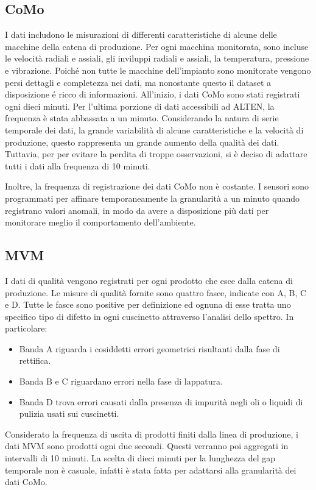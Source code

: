\subsection{CoMo}
I dati includono le misurazioni di differenti caratteristiche di alcune delle macchine della catena di produzione. Per ogni macchina monitorata, sono incluse le velocità radiali e assiali, gli inviluppi radiali e assiali, la temperatura, pressione e vibrazione.
Poiché non tutte le macchine dell'impianto sono monitorate vengono persi dettagli e completezza nei dati, ma nonostante questo il dataset a disposizione é ricco di informazioni.
All'inizio, i dati CoMo sono stati registrati ogni dieci minuti.
Per l'ultima porzione di dati accessibili ad ALTEN, la frequenza è stata abbassata a un minuto.
Considerando la natura di serie temporale dei dati, la grande variabilità di alcune caratteristiche e la velocità di produzione, questo rappresenta un grande aumento della qualità dei dati. Tuttavia, per per evitare la perdita di troppe osservazioni, si è deciso di adattare tutti i dati alla frequenza di 10 minuti.


Inoltre, la frequenza di registrazione dei dati CoMo non è costante. I sensori sono programmati per affinare temporaneamente la granularità a
un minuto quando registrano valori anomali, in modo da avere a disposizione più dati per monitorare meglio il comportamento dell'ambiente.
\subsection{MVM}
I dati di qualità vengono registrati per ogni prodotto che esce dalla catena di produzione.
Le misure di qualità fornite sono quattro fasce, indicate con A, B, C e D.
Tutte le fasce sono positive per definizione ed ognuna di esse tratta uno specifico tipo di difetto in ogni cuscinetto attraverso l'analisi dello spettro. In particolare:
\begin{itemize}
	\item Banda A riguarda i cosiddetti errori geometrici risultanti dalla fase di rettifica.
	\item Banda B e C riguardano errori nella fase di lappatura.
	\item Banda D trova errori causati dalla presenza di impurità negli oli o liquidi di pulizia usati sui cuscinetti.
\end{itemize}

Considerato la frequenza di uscita di prodotti finiti dalla linea di produzione, i dati MVM sono prodotti ogni due secondi. Questi verranno poi aggregati in intervalli di 10 minuti. La scelta di dieci minuti per la lunghezza del gap temporale non è casuale, infatti è stata fatta per adattarsi alla granularità dei dati CoMo.

